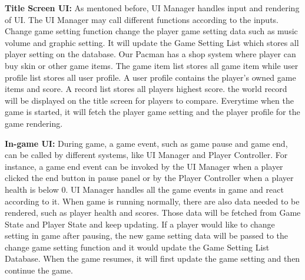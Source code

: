 \documentclass{article}
\begin{document}
\textbf{Title Screen UI:} As mentoned before, UI Manager handles input and rendering of UI. The UI Manager may call different functions according to the inputs. Change game setting function change the player game setting data such as music volume and graphic setting. It will update the Game Setting List which stores all player setting on the database. Our Pacman has a shop system where player can buy skin or other game items. The game item list stores all game item while user profile list stores all user profile. A user profile contains the player's owned game items and score. A record list stores all players highest score. the world record will be displayed on the title screen for players to compare. Everytime when the game is started, it will fetch the player game setting and the player profile for the game rendering.

\textbf{In-game UI:} During game, a game event, such as game pause and game end, can be called by different systems, like UI Manager and Player Controller. For instance, a game end event can be invoked by the UI Manager when a player clicked the end button in pause panel or by the Player Controller when a player health is below 0. UI Manager handles all the game events in game and react according to it. When game is running normally, there are also data needed to be rendered, such as player health and scores. Those data will be fetched from Game State and Player State and keep updating. If a player would like to change setting in game after pausing, the new game setting data will be passed to the change game setting function and it would update the Game Setting List Database. When the game resumes, it will first update the game setting and then continue the game.
\end{document}
